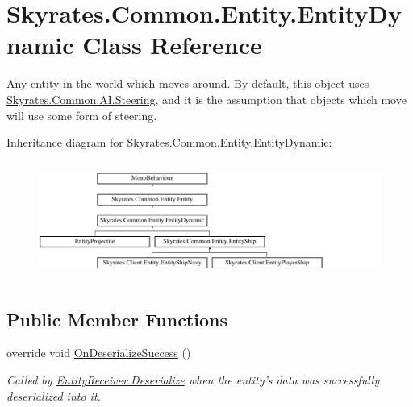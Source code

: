 \hypertarget{class_skyrates_1_1_common_1_1_entity_1_1_entity_dynamic}{\section{Skyrates.\-Common.\-Entity.\-Entity\-Dynamic Class Reference}
\label{class_skyrates_1_1_common_1_1_entity_1_1_entity_dynamic}
}


Any entity in the world which moves around. By default, this object uses \hyperlink{class_skyrates_1_1_common_1_1_a_i_1_1_steering}{Skyrates.\-Common.\-A\-I.\-Steering}, and it is the assumption that objects which move will use some form of steering.  


Inheritance diagram for Skyrates.\-Common.\-Entity.\-Entity\-Dynamic\-:\begin{figure}[H]
\begin{center}
\leavevmode
\includegraphics[height=3.888889cm]{class_skyrates_1_1_common_1_1_entity_1_1_entity_dynamic}
\end{center}
\end{figure}
\subsection*{Public Member Functions}
\begin{DoxyCompactItemize}
\item 
override void \hyperlink{class_skyrates_1_1_common_1_1_entity_1_1_entity_dynamic_aedeb63ce173df35eb21d75161d01028d}{On\-Deserialize\-Success} ()
\begin{DoxyCompactList}\small\item\em Called by \hyperlink{class_skyrates_1_1_common_1_1_entity_1_1_entity_receiver_a9da0b7c3a8b9e1ed7d10be74ce80482b}{Entity\-Receiver.\-Deserialize} when the entity's data was successfully deserialized into it. \end{DoxyCompactList}\end{DoxyCompactItemize}
